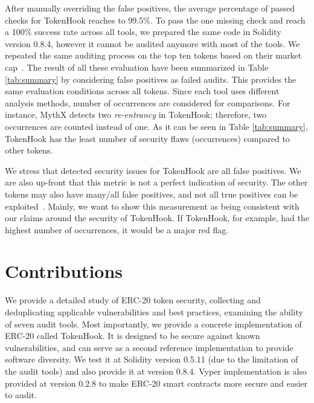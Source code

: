 After manually overriding the false positives, the average percentage of passed checks for TokenHook reaches to 99.5\%. To pass the one missing check and reach a 100\% success rate across all tools, we prepared the same code in Solidity version 0.8.4, however it cannot be audited anymore with most of the tools. We repeated the same auditing process on the top ten tokens based on their market cap~\cite{TokenTracker}. The result of all these evaluation have been summarized in Table \ref{tab:summary} by considering false positives as failed audits. This provides the same evaluation conditions across all tokens. Since each tool uses different analysis methods, number of occurrences are considered for comparisons. For instance, MythX detects two \textit{re-entrancy} in TokenHook; therefore, two occurrences are counted instead of one. As it can be seen in Table \ref{tab:summary}, TokenHook has the least number of security flaws (occurrences) compared to other tokens.


We stress that detected security issues for TokenHook are all false positives. We are also up-front that this metric is not a perfect indication of security. The other tokens may also have many/all false positives, and not all true positives can be exploited~\cite{VulExp}. Mainly, we want to show this measurement as being consistent with our claims around the security of TokenHook. If TokenHook, for example, had the highest number of occurrences, it would be a major red flag.

\section{Contributions}
We provide a detailed study of ERC-20 token security, collecting and deduplicating applicable vulnerabilities and best practices, examining the ability of seven audit tools. Most importantly, we provide a concrete implementation of ERC-20 called TokenHook. It is designed to be secure against known vulnerabilities, and can serve as a second reference implementation to provide software diversity. We test it at Solidity version 0.5.11 (due to the limitation of the audit tools) and also provide it at version 0.8.4. Vyper implementation is also provided at version 0.2.8 to make ERC-20 smart contracts more secure and easier to audit.


